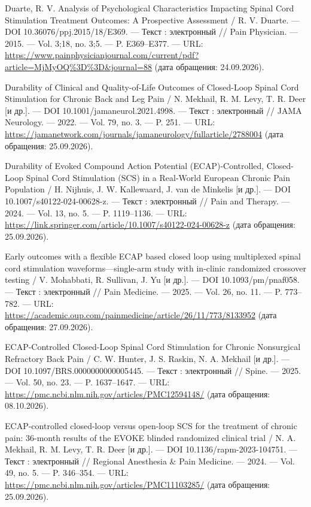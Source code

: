 \begin{list}{}{\setlength{\leftmargin}{10mm}\setlength{\labelwidth}{8mm}\setlength{\labelsep}{2mm}\setlength{\itemsep}{0pt}\setlength{\parsep}{0pt}\setlength{\topsep}{0pt}}
\item[104.] Duarte, R. V. Analysis of Psychological Characteristics Impacting Spinal Cord Stimulation Treatment Outcomes: A Prospective Assessment / R. V. Duarte. — DOI 10.36076/ppj.2015/18/E369. — Текст : электронный // Pain Physician. — 2015. — Vol. 3;18, no. 3;5. — P. E369–E377. — URL: \url{https://www.painphysicianjournal.com/current/pdf?article=MjMyOQ\%3D\%3D\&journal=88} (дата обращения: 24.09.2026).
\item[105.] Durability of Clinical and Quality-of-Life Outcomes of Closed-Loop Spinal Cord Stimulation for Chronic Back and Leg Pain / N. Mekhail, R. M. Levy, T. R. Deer [и др.]. — DOI 10.1001/jamaneurol.2021.4998. — Текст : электронный // JAMA Neurology. — 2022. — Vol. 79, no. 3. — P. 251. — URL: \url{https://jamanetwork.com/journals/jamaneurology/fullarticle/2788004} (дата обращения: 25.09.2026).
\item[106.] Durability of Evoked Compound Action Potential (ECAP)-Controlled, Closed-Loop Spinal Cord Stimulation (SCS) in a Real-World European Chronic Pain Population / H. Nijhuis, J. W. Kallewaard, J. van de Minkelis [и др.]. — DOI 10.1007/s40122-024-00628-z. — Текст : электронный // Pain and Therapy. — 2024. — Vol. 13, no. 5. — P. 1119–1136. — URL: \url{https://link.springer.com/article/10.1007/s40122-024-00628-z} (дата обращения: 25.09.2026).
\item[107.] Early outcomes with a flexible ECAP based closed loop using multiplexed spinal cord stimulation waveforms—single-arm study with in-clinic randomized crossover testing / V. Mohabbati, R. Sullivan, J. Yu [и др.]. — DOI 10.1093/pm/pnaf058. — Текст : электронный // Pain Medicine. — 2025. — Vol. 26, no. 11. — P. 773–782. — URL: \url{https://academic.oup.com/painmedicine/article/26/11/773/8133952} (дата обращения: 27.09.2026).
\item[108.] ECAP-Controlled Closed-Loop Spinal Cord Stimulation for Chronic Nonsurgical Refractory Back Pain / C. W. Hunter, J. S. Raskin, N. A. Mekhail [и др.]. — DOI 10.1097/BRS.0000000000005445. — Текст : электронный // Spine. — 2025. — Vol. 50, no. 23. — P. 1637–1647. — URL: \url{https://pmc.ncbi.nlm.nih.gov/articles/PMC12594148/} (дата обращения: 08.10.2026).
\item[109.] ECAP-controlled closed-loop versus open-loop SCS for the treatment of chronic pain: 36-month results of the EVOKE blinded randomized clinical trial / N. A. Mekhail, R. M. Levy, T. R. Deer [и др.]. — DOI 10.1136/rapm-2023-104751. — Текст : электронный // Regional Anesthesia \& Pain Medicine. — 2024. — Vol. 49, no. 5. — P. 346–354. — URL: \url{https://pmc.ncbi.nlm.nih.gov/articles/PMC11103285/} (дата обращения: 25.09.2026).

\end{list}
